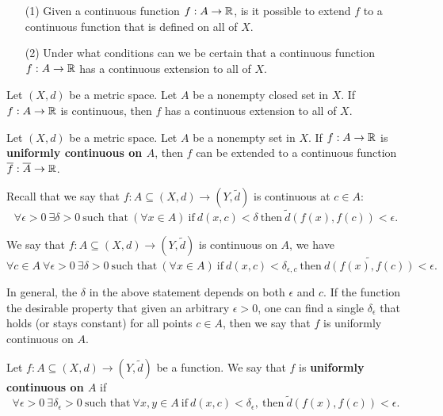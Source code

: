 \documentclass[a4paper]{article}
\begin{document}
\begin{enumerate}
    \item[(1)] Given a continuous function \( f: A \to \mathbb{R}  \), is it possible to extend \( f  \) to a continuous function that is defined on all of \( X  \).
    \item[(2)] Under what conditions can we be certain that a continuous function \( f: A \to \mathbb{R}  \) has a continuous extension to all of \( X  \).
\end{enumerate}

\begin{theorem}
    Let \( (X,d) \) be a metric space. Let \( A  \) be a nonempty closed set in \( X  \). If \( f: A \to \mathbb{R}  \) is continuous, then \( f \) has a continuous extension to all of \( X  \).
\end{theorem}

\begin{theorem}[ ]
    Let \( (X,d) \) be a metric space. Let \( A  \) be a nonempty set in \( X  \). If \( f: A \to \mathbb{R}  \) is \textbf{uniformly continuous on \( A  \)}, then \( f  \) can be extended to a continuous function \( \overline{f} : \overline{A} \to \mathbb{R}  \).
\end{theorem}

Recall that we say that \( f: A \subseteq (X,d) \to (Y, \tilde{d}) \) is continuous at \( c \in A  \):
\[  \forall \epsilon > 0 \ \exists \delta > 0 \ \text{such that} \ (\forall x \in A ) \ \text{if} \ d(x,c) < \delta \ \text{then} \ \tilde{d}(f(x), f(c)) < \epsilon. \]

We say that \( f: A \subseteq  (X,d) \to (Y,\tilde{d}) \) is continuous on \( A  \), we have 
\[  \forall c \in A \  \forall \epsilon > 0 \ \exists \delta > 0 \ \text{such that} \ (\forall x \in A) \ \text{if} \ d(x,c) < \delta_{\epsilon, c} \ \text{then} \ \tilde{d(f(x), f(c))} < \epsilon.  \]

In general, the \( \delta  \) in the above statement depends on both \( \epsilon  \) and \( c  \). If the function the desirable property that given an arbitrary \( \epsilon > 0  \), one can find a single \( {\delta}_{\epsilon} \) that holds (or stays constant) for all points \( c \in A  \), then we say that \( f  \) is uniformly continuous on \( A  \).

\begin{definition}
    Let \( f: A \subseteq (X,d) \to (Y,\tilde{d}) \) be a function. We say that \( f \) is \textbf{uniformly continuous on \( A \)} if 
    \[  \forall \epsilon > 0 \ \exists {\delta}_{\epsilon} > 0 \ \text{such that} \ \forall x,y \in A \ \text{if} \ d(x,c) < {\delta}_{\epsilon}, \ \text{then} \ \tilde{d}(f(x),f(c)) < \epsilon. \]
\end{definition}
\end{document}
